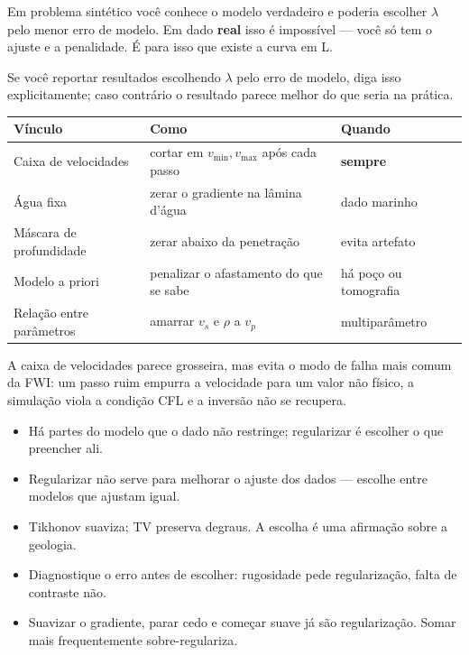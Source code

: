\documentclass[11pt,a4paper,oneside]{report}
\begin{document}
\begin{armadilha}
Em problema sint\'etico voc\^e conhece o modelo verdadeiro e poderia escolher
$\lambda$ pelo menor erro de modelo. Em dado \textbf{real} isso \'e
imposs\'ivel --- voc\^e s\'o tem o ajuste e a penalidade. \'E para isso que
existe a curva em L.

Se voc\^e reportar resultados escolhendo $\lambda$ pelo erro de modelo, diga
isso explicitamente; caso contr\'ario o resultado parece melhor do que seria
na pr\'atica.
\end{armadilha}

\begin{center}
\begin{tabular}{@{}lll@{}}
\toprule
\textbf{V\'inculo} & \textbf{Como} & \textbf{Quando} \\
\midrule
Caixa de velocidades & cortar em $v_{\min}, v_{\max}$ ap\'os cada passo
  & \textbf{sempre} \\
\'Agua fixa & zerar o gradiente na l\^amina d'\'agua & dado marinho \\
M\'ascara de profundidade & zerar abaixo da penetra\c{c}\~ao & evita
  artefato \\
Modelo a priori & penalizar o afastamento do que se sabe & h\'a po\c{c}o ou
  tomografia \\
Rela\c{c}\~ao entre par\^ametros & amarrar $v_s$ e $\rho$ a $v_p$ &
  multipar\^ametro \\
\bottomrule
\end{tabular}
\end{center}

A caixa de velocidades parece grosseira, mas evita o modo de falha mais comum
da FWI: um passo ruim empurra a velocidade para um valor n\~ao f\'isico, a
simula\c{c}\~ao viola a condi\c{c}\~ao CFL e a invers\~ao n\~ao se recupera.

\begin{resumo}
\begin{itemize}[leftmargin=*, itemsep=1pt]
\item H\'a partes do modelo que o dado n\~ao restringe; regularizar \'e
escolher o que preencher ali.
\item Regularizar n\~ao serve para melhorar o ajuste dos dados --- escolhe entre modelos
que ajustam igual.
\item Tikhonov suaviza; TV preserva degraus. A escolha \'e uma afirma\c{c}\~ao
sobre a geologia.
\item Diagnostique o erro antes de escolher: rugosidade pede
regulariza\c{c}\~ao, falta de contraste n\~ao.
\item Suavizar o gradiente, parar cedo e come\c{c}ar suave j\'a s\~ao
regulariza\c{c}\~ao. Somar mais frequentemente sobre-regulariza.
\end{itemize}
\end{resumo}
\end{document}
